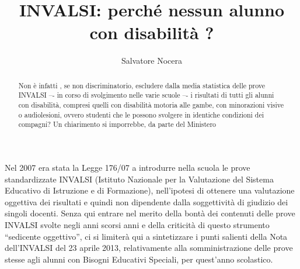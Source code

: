\author{Salvatore Nocera}
\title{INVALSI: perché nessun alunno con disabilità ?}
\label{nocera150513}
\begin{abstract}
Non è infatti , se non discriminatorio, escludere dalla media statistica delle prove INVALSI –- in corso di svolgimento nelle varie scuole –- i risultati di tutti gli alunni con disabilità, compresi quelli con disabilità motoria alle gambe, con minorazioni visive o audiolesioni, ovvero studenti che le possono svolgere in identiche condizioni dei compagni? Un chiarimento si imporrebbe, da parte del Ministero
\end{abstract}
\maketitle
{}
Nel 2007 era stata la Legge 176/07 a introdurre nella scuola le prove standardizzate INVALSI (Istituto Nazionale per la Valutazione del Sistema Educativo di Istruzione e di Formazione), nell'ipotesi di ottenere una valutazione oggettiva dei risultati e quindi non dipendente dalla soggettività di giudizio dei singoli docenti.
Senza qui entrare nel merito della bontà dei contenuti delle prove INVALSI svolte negli anni scorsi anni e della criticità di questo strumento “sedicente oggettivo”, ci si limiterà qui a sintetizzare i punti salienti della Nota dell'INVALSI del 23 aprile 2013, relativamente alla somministrazione delle prove stesse agli alunni con Bisogni Educativi Speciali, per quest'anno scolastico.

